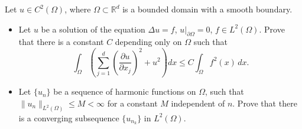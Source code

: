 \begin{exercise}
\label{analysis:2015:12}
Let $u\in C^2(\Omega)$, where $\Omega\subset\mathbb{R}^d$ is a bounded domain with a smooth boundary.

\begin{itemize}
\item[a)] Let $u$ be a solution of the equation $\Delta u = f$, $u|_{\partial\Omega}=0$, $f\in L^2(\Omega)$. Prove that there is a constant $C$ depending only on $\Omega$ such that
\[
\int_{\Omega}\left(\sum_{j=1}^d\left(\frac{\partial u}{\partial x_j}\right)^2 + u^2\right)dx \leq C\int_{\Omega}f^2(x)\,dx.
\]

\item[b)] Let $\{u_n\}$ be a sequence of harmonic functions on $\Omega$, such that $\|u_n\|_{L^2(\Omega)}\leq M < \infty$ for a constant $M$ independent of $n$. Prove that there is a converging subsequence $\{u_{n_k}\}$ in $L^2(\Omega)$.
\end{itemize}
\end{exercise}

